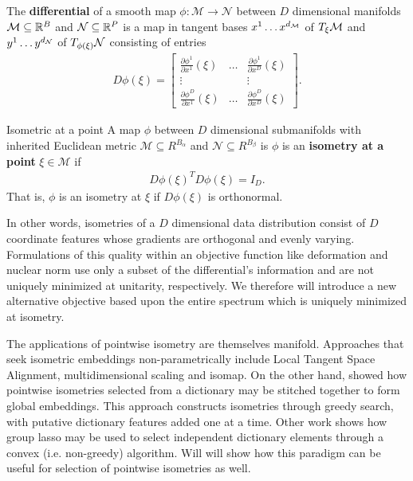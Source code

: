\begin{definition}
The \textbf{differential} of a smooth map $\phi:\mathcal M \to \mathcal N$ between $D$ dimensional manifolds $\mathcal{M} \subseteq \mathbb R^B$ and $\mathcal{N} \subseteq \mathbb R^P$ is a map in tangent bases $x^1 \dots x^{d_{\mathcal{M}}}$ of $T_\xi \mathcal{M}$ and $y^1 \dots y^{d_{\mathcal{N}}}$ of $T_{\phi(\xi)} \mathcal{N}$ consisting of entries
\begin{align}
\label{eq:diff}
    D\phi (\xi) = \begin{bmatrix}
    \frac{\partial \phi^1  }{\partial x^1}(\xi)  & \dots & \frac{\partial \phi^1 }{\partial x^D}(\xi)  \\
    \vdots & & \vdots \\
    \frac{\partial \phi^D }{\partial x^1}(\xi)  & \dots & \frac{\partial \phi^{D}  }{\partial x^{D}}(\xi) 
    \end{bmatrix}.
\end{align}
\end{definition}

\begin{definition}{Isometric at a point}
\label{def:isometric_at_a_point}
A map $\phi$ between $D$ dimensional submanifolds with inherited Euclidean metric $\mathcal M \subseteq R^{B_\alpha}$ and $\mathcal N  \subseteq R^{B_\beta}$ is 
$\phi$ is an \textbf{isometry at a point} $\xi \in \mathcal M$ if
\begin{align}
{D \phi (\xi)}^T D \phi (\xi) = I_D.
\end{align}
That is, $\phi$ is an isometry at $\xi$ if $D \phi (\xi)$ is orthonormal.
\end{definition}

In other words, isometries of a $D$ dimensional data distribution consist of $D$ coordinate features whose gradients are orthogonal and evenly varying.
Formulations of this quality within an objective function like deformation \citep{Kohli2021-lr} and nuclear norm \citep{Boyd2004-ql} use only a subset of the differential's information and are not uniquely minimized at unitarity, respectively.
We therefore will introduce a new alternative objective based upon the entire spectrum which is uniquely minimized at isometry.

The applications of pointwise isometry are themselves manifold.
Approaches that seek isometric embeddings non-parametrically include Local Tangent Space Alignment, multidimensional scaling and isomap. %
On the other hand, \citet{Kohli2021-lr} showed how pointwise isometries selected from a dictionary may be stitched together to form global embeddings.
This approach constructs isometries through greedy search, with putative dictionary features added one at a time.
Other work \citep{Koelle2022-ju, Koelle2024-no} shows how group lasso may be used to select independent dictionary elements through a convex (i.e. non-greedy) algorithm.
Will will show how this paradigm can be useful for selection of pointwise isometries as well.

